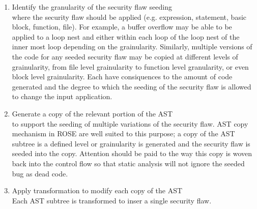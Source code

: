 \begin{enumerate}
\begin{enumerate}
               \item Identify the granularity of the security flaw seeding \\ 
                     where the security flaw should be applied
                     (e.g. expression, statement, basic block, function, file).
                     For example, a buffer overflow may be able to be applied to a loop
                     nest and either within each loop of the loop nest of the inner most
                     loop depending on the grainularity.  Similarly, multiple versions
                     of the code for any seeded security flaw may be copied at different
                     levels of grainularity, from file level grainularity to function
                     level granularity, or even block level grainularity.  Each have
                     consiquences to the amount of code generated and the degree to which
                     the seeding of the security flaw is allowed to change the input
                     application.
 
               \item Generate a copy of the relevant portion of the AST \\
                     to support the seeding of multiple variations of the security flaw.
                     AST copy mechanism in ROSE are well suited to this purpose; a copy of
                     the AST subtree is a defined level or grainularity is generated and
                     the security flaw is seeded into the copy. Attention should be
                     paid to the way this copy is woven back into the control flow so that
                     static analysis will not ignore the seeded bug as dead code.

               \item Apply transformation to modify each copy of the AST \\
                     Each AST subtree is transformed to inser a single security flaw.

            \end{enumerate}


\end{enumerate}
